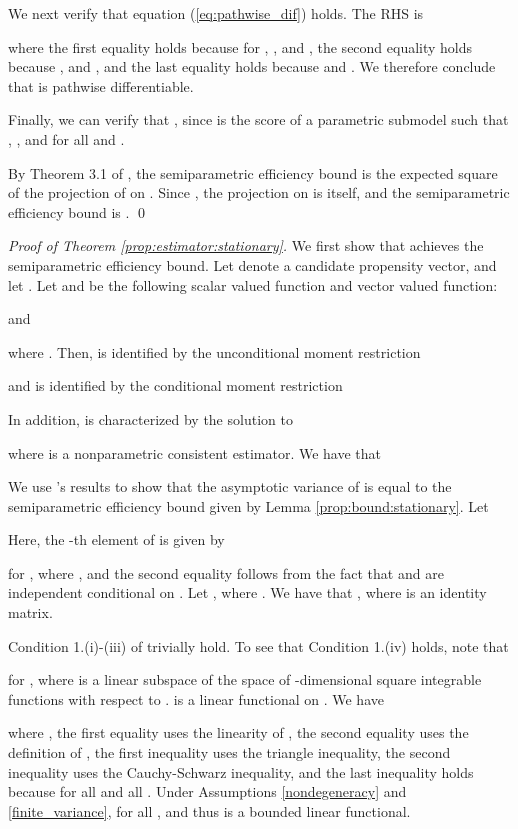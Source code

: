 \documentclass[letterpaper]{article} \usepackage{aaai19}  \usepackage{times}  \usepackage{helvet}  \usepackage{courier}  \usepackage{url}  \usepackage{graphicx}  \frenchspacing  \usepackage{comment}
\newcommand{\citet}[1]
{\citeauthor{#1} \shortcite{#1}}
\begin{document}
We next verify that equation (\ref{eq:pathwise_dif}) holds.
The RHS is

where the first equality holds because  for , , and , the second equality holds because , and , and the last equality holds because  and .
We therefore conclude that  is pathwise differentiable.

Finally, we can verify that , since  is the score of a parametric submodel such that , , and  for all  and .

By Theorem 3.1 of \citet{Newey1990}, the semiparametric efficiency bound is the expected square of the projection of  on .
Since , the projection on  is itself, and the semiparametric efficiency bound is .
\qed
\par
\bigskip
\noindent
\noindent \textit{Proof of Theorem \ref{prop:estimator:stationary}.}
We first show that  achieves the semiparametric efficiency bound.
Let  denote a candidate propensity vector, and let .
Let  and  be the following scalar valued function and  vector valued function:

and

where .
Then,  is identified by the unconditional moment restriction

and  is identified by the conditional moment restriction

In addition,  is characterized by the solution to

where  is a nonparametric consistent estimator.
We have that


We use \citet{Ackerberg2014}'s results to show that the asymptotic variance of  is equal to the semiparametric efficiency bound given by Lemma \ref{prop:bound:stationary}.
Let

Here, the -th element of  is given by

for , where , and the second equality follows from the fact that  and  are independent conditional on .
Let , where .
We have that , where  is an  identity matrix.

Condition 1.(i)-(iii) of \citet{Ackerberg2014} trivially hold.
To see that Condition 1.(iv) holds, note that

for , where  is a linear subspace of the space of -dimensional square integrable functions with respect to .
 is a linear functional on .
We have

where , the first equality uses the linearity of , the second equality uses the definition of , the first inequality uses the triangle inequality, the second inequality uses the Cauchy-Schwarz inequality, and the last inequality holds because  for all  and all .
Under Assumptions \ref{nondegeneracy} and \ref{finite_variance},  for all , and thus  is a bounded linear functional.
\end{document}
